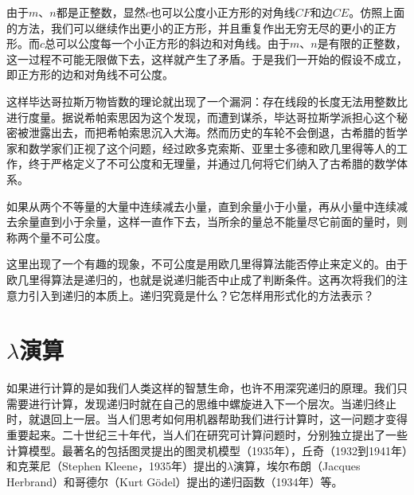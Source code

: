 \documentclass{article}
\begin{document}
由于$m$、$n$都是正整数，显然$c$也可以公度小正方形的对角线$CF$和边$CE$。仿照上面的方法，我们可以继续作出更小的正方形，并且重复作出无穷无尽的更小的正方形。而$c$总可以公度每一个小正方形的斜边和对角线。由于$m$、$n$是有限的正整数，这一过程不可能无限做下去，这样就产生了矛盾。于是我们一开始的假设不成立，即正方形的边和对角线不可公度。

这样毕达哥拉斯万物皆数的理论就出现了一个漏洞：存在线段的长度无法用整数比进行度量。据说希帕索思因为这个发现，而遭到谋杀，毕达哥拉斯学派担心这个秘密被泄露出去，而把希帕索思沉入大海。然而历史的车轮不会倒退，古希腊的哲学家和数学家们正视了这个问题，经过欧多克索斯、亚里士多德和欧几里得等人的工作，终于严格定义了不可公度和无理量，并通过几何将它们纳入了古希腊的数学体系。

\begin{proposition}
如果从两个不等量的大量中连续减去小量，直到余量小于小量，再从小量中连续减去余量直到小于余量，这样一直作下去，当所余的量总不能量尽它前面的量时，则称两个量不可公度。
\end{proposition}

这里出现了一个有趣的现象，不可公度是用欧几里得算法能否停止来定义的。由于欧几里得算法是递归的，也就是说递归能否中止成了判断条件。这再次将我们的注意力引入到递归的本质上。递归究竟是什么？它怎样用形式化的方法表示？

\begin{Exercise}
\end{Exercise}

\section{$\lambda$演算}

如果进行计算的是如我们人类这样的智慧生命，也许不用深究递归的原理。我们只需要进行计算，发现递归时就在自己的思维中螺旋进入下一个层次。当递归终止时，就退回上一层。当人们思考如何用机器帮助我们进行计算时，这一问题才变得重要起来。二十世纪三十年代，当人们在研究可计算问题时，分别独立提出了一些计算模型。最著名的包括图灵提出的图灵机模型（1935年），丘奇（1932到1941年）和克莱尼（Stephen Kleene，1935年）提出的$\lambda$演算，埃尔布朗（Jacques Herbrand）和哥德尔（Kurt Gödel）提出的递归函数（1934年）等。
\end{document}
